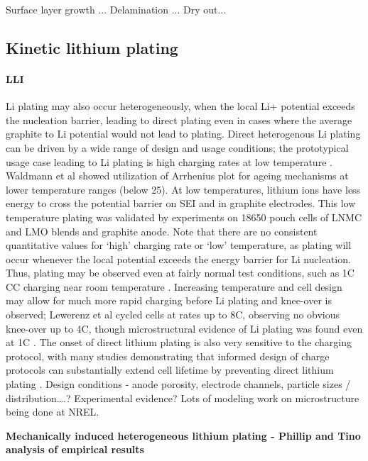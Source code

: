 \documentclass{article}
\begin{document}
Surface layer growth ...
Delamination ...
Dry out...


\subsection{Kinetic lithium plating}
\paragraph{LLI}
Li plating may also occur heterogeneously, when the local Li+ potential exceeds the nucleation barrier, leading to direct plating even in cases where the average graphite to Li potential would not lead to plating. Direct heterogenous Li plating can be driven by a wide range of design and usage conditions; the prototypical usage case leading to Li plating is high charging rates at low temperature \cite{waldmann_temperature_2014, petzl_lithium_2015}. Waldmann et al showed utilization of Arrhenius plot for ageing mechanisms at lower temperature ranges (below 25{\celsius}). At low temperatures, lithium ions have less energy to cross the potential barrier on SEI and in graphite electrodes. This low temperature plating was validated by experiments on 18650 pouch cells of LNMC and LMO blends and graphite anode. Note that there are no consistent quantitative values for ‘high’ charging rate or ‘low’ temperature, as plating will occur whenever the local potential exceeds the energy barrier for Li nucleation. Thus, plating may be observed even at fairly normal test conditions, such as 1C CC charging near room temperature \cite{waldmann_optimization_2015,burns_-situ_2015}. Increasing temperature and cell design may allow for much more rapid charging before Li plating and knee-over is observed; Lewerenz et al cycled cells at rates up to 8C, observing no obvious knee-over up to 4C, though microstructural evidence of Li plating was found even at 1C \cite{lewerenz_systematic_2017}. The onset of direct lithium plating is also very sensitive to the charging protocol, with many studies demonstrating that informed design of charge protocols can substantially extend cell lifetime by preventing direct lithium plating \cite{waldmann_optimization_2015,schindler_fast_2018}.
Design conditions - anode porosity, electrode channels, particle sizes / distribution….? Experimental evidence? Lots of modeling work on microstructure being done at NREL.

\textbf{Mechanically induced heterogeneous lithium plating - Phillip and Tino analysis of empirical results}
\end{document}
